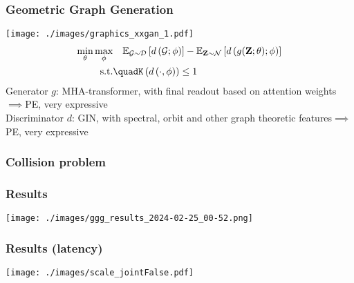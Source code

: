 \documentclass[./presentation.tex]{subfiles}
\begin{document}
\begin{frame}[label=working,t]
  \frametitle{Geometric Graph Generation}
  \texttt{[image: ./images/graphics\_xxgan\_1.pdf]}
  \vspace{-0.5cm}
  \begin{align}
    \min_{\theta}\max_{\phi}&\quad\mathbb{E}_{\mathcal{G}\sim \mathcal{D}}\left[d\left(\mathcal{G};\phi\right)\right]-\mathbb{E}_{\mathbf{Z}\sim \mathcal{N}}\left[d\left(g(\mathbf{Z};\theta);\phi\right)\right]\nonumber\\
    \text{s.t.}&\quadK\left(d\left(\cdot,\phi\right)\right)\leq 1\nonumber
  \end{align}
  \vspace{-0.25cm}
  Generator $g$: MHA-transformer, with final readout based on attention weights$\implies$PE, very expressive\\
  Discriminator $d$: GIN, with spectral, orbit and other graph theoretic features$\implies$PE, very expressive
\end{frame}


\begin{frame}[label=working,t]
  \frametitle{Collision problem }
\end{frame}
\begin{frame}[label=working,t]
  \frametitle{Results}
  \centering
    \texttt{[image: ./images/ggg\_results\_2024-02-25\_00-52.png]}
\end{frame}
\begin{frame}[label=working,t]
  \frametitle{Results (latency)}
  \texttt{[image: ./images/scale\_jointFalse.pdf]}
\end{frame}
\end{document}
